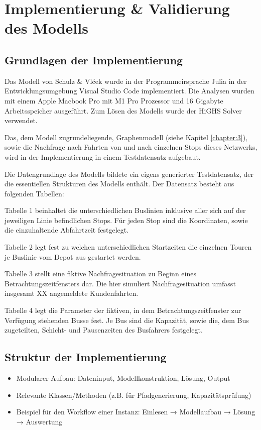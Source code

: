 \chapter{Implementierung \& Validierung des Modells}
\label{chapter:5}
\section{Grundlagen der Implementierung}
Das Modell von Schulz \& Vlćek wurde in der Programmeirsprache Julia in der Entwicklungsumgebung Visual Studio Code implementiert. Die Analysen wurden mit einem Apple Macbook Pro mit M1 Pro Prozessor und 16 Gigabyte Arbeitsspeicher ausgeführt. Zum Lösen des Modells wurde der HiGHS Solver verwendet. 

Das, dem Modell zugrundeliegende, Graphenmodell (siehe Kapitel \ref{chapter:3}), sowie die Nachfrage nach Fahrten von und nach einzelnen Stops dieses Netzwerks, wird in der Implementierung in einem Testdatensatz aufgebaut. %

Die Datengrundlage des Modells bildete ein eigens generierter Testdatensatz, der die essentiellen Strukturen des Modells enthält. Der Datensatz besteht aus folgenden Tabellen:

Tabelle 1 beinhaltet die unterschiedlichen Buslinien inklusive aller sich auf der jeweiligen Linie befindlichen Stops. Für jeden Stop sind die Koordinaten, sowie die einzuhaltende Abfahrtzeit festgelegt. 

Tabelle 2 legt fest zu welchen unterschiedlichen Startzeiten die einzelnen Touren je Buslinie vom Depot aus gestartet werden. 

Tabelle 3 stellt eine fiktive Nachfragesituation zu Beginn eines Betrachtungszeitfensters dar. Die hier simuliert Nachfragesituation umfasst insgesamt XX angemeldete Kundenfahrten. 

Tabelle 4 legt die Parameter der fiktiven, in dem Betrachtungszeitfenster zur Verfügung stehenden Busse fest. Je Bus sind die Kapazität, sowie die, dem Bus zugeteilten, Schicht- und Pausenzeiten des Busfahrers festgelegt.

\section{Struktur der Implementierung}
\begin{itemize}
    \item Modularer Aufbau: Dateninput, Modellkonstruktion, Lösung, Output
    \item Relevante Klassen/Methoden (z.B. für Pfadgenerierung, Kapazitätsprüfung)
    \item Beispiel für den Workflow einer Instanz: Einlesen → Modellaufbau → Lösung → Auswertung
\end{itemize}

